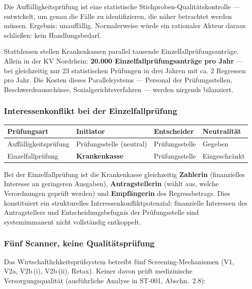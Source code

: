 \documentclass{umbruch-position}
\begin{document}
Die Auffälligkeitsprüfung ist eine statistische Stichproben-Qualitätskontrolle — entwickelt, um genau die Fälle zu identifizieren, die näher betrachtet werden müssen. Ergebnis: unauffällig. Normalerweise würde ein rationaler Akteur daraus schließen: kein Handlungsbedarf.

Stattdessen stellen Krankenkassen parallel tausende Einzelfallprüfungsanträge. Allein in der KV Nordrhein: \textbf{20.000 Einzelfallprüfungsanträge pro Jahr} — bei gleichzeitig nur 23 statistischen Prüfungen in drei Jahren mit ca. 2 Regressen pro Jahr. Die Kosten dieses Parallelsystems — Personal der Prüfungsstellen, Beschwerdeausschüsse, Sozialgerichtsverfahren — werden nirgends bilanziert.

\subsubsection{Interessenkonflikt bei der Einzelfallprüfung}

{\small
\begin{tabularx}{\textwidth}{X X X X}
\toprule
\textbf{Prüfungsart} & \textbf{Initiator} & \textbf{Entscheider} & \textbf{Neutralität} \\
\midrule
Auffälligkeitsprüfung & Prüfungsstelle (neutral) & Prüfungsstelle & Gegeben \\
Einzelfallprüfung & \textbf{Krankenkasse} & Prüfungsstelle & Eingeschränkt \\
\bottomrule
\end{tabularx}
}

Bei der Einzelfallprüfung ist die Krankenkasse gleichzeitig \textbf{Zahlerin} (finanzielles Interesse an geringeren Ausgaben), \textbf{Antragstellerin} (wählt aus, welche Verordnungen geprüft werden) und \textbf{Empfängerin} des Regressbetrags. Dies konstituiert ein strukturelles Interessenkonfliktpotenzial: finanzielle Interessen des Antragstellers und Entscheidungsbefugnis der Prüfungsstelle sind systemimmanent nicht vollständig entkoppelt.

\subsubsection{F\"unf Scanner, keine Qualit\"atspr\"ufung}

Das Wirtschaftlichkeitspr\"ufsystem betreibt f\"unf Screening-Mechanismen (V1, V2a, V2b\,(i), V2b\,(ii), Retax). Keiner davon pr\"uft medizinische Versorgungsqualit\"at (ausf\"uhrliche Analyse in ST-001, Abschn.~2.8):
\end{document}
